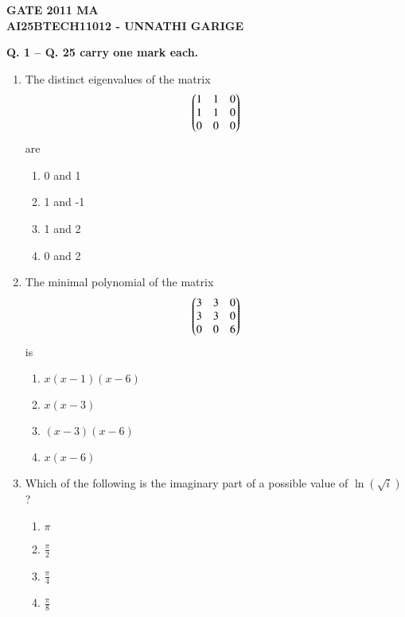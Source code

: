\documentclass[journal]{IEEEtran}
\numberwithin{equation}{enumi}
\numberwithin{figure}{enumi}
\begin{document}



\begin{center}
    \LARGE \textbf{GATE 2011 MA}\\[0.5em]
    \large \textbf{AI25BTECH11012 - UNNATHI GARIGE}
\end{center}

\noindent
\textbf{Q. 1 -- Q. 25 carry one mark each.}
\vspace{1em}


\begin{enumerate}


\item The distinct eigenvalues of the matrix
\begin{align*}
 \begin{pmatrix}
1 & 1 & 0 \\
1 & 1 & 0 \\
0 & 0 & 0
\end{pmatrix}
\end{align*}
are
\hfill{}
\begin{multicols}{4}
\begin{enumerate}
    \item 0 and 1
    \item 1 and -1
    \item 1 and 2 
    \item 0 and 2
\end{enumerate}
\end{multicols}


\item The minimal polynomial of the matrix
\begin{align*}
\begin{pmatrix}
3 & 3 & 0 \\
3 & 3 & 0 \\
0 & 0 & 6
\end{pmatrix}
\end{align*}
is
\hfill{}
\begin{multicols}{4}
\begin{enumerate}
    \item $x(x-1)(x-6)$
    \item $x(x-3)$
    \item $(x-3)(x-6)$
    \item  $x(x-6)$
\end{enumerate}
\end{multicols}



\item Which of the following is the imaginary part of a possible value of $\ln(\sqrt{i})$?
\hfill{}
\begin{multicols}{4}
\begin{enumerate}
    \item $\pi$
    \item $\frac{\pi}{2}$
    \item $\frac{\pi}{4}$ 
    \item  $\frac{\pi}{8}$
\end{enumerate}
\end{multicols}



\end{enumerate}
\end{document}
